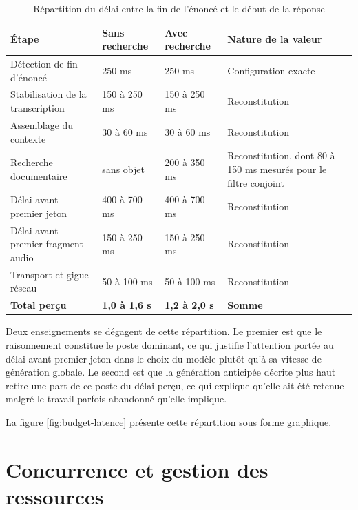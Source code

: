 \begin{table}[H]
\centering
\renewcommand{\arraystretch}{1.2}
\begin{tabular}{|p{5.0cm}|p{2.6cm}|p{2.6cm}|p{3.6cm}|}
\hline
\textbf{Étape} & \textbf{Sans recherche} & \textbf{Avec recherche} & \textbf{Nature de la valeur} \\
\hline
Détection de fin d'énoncé & 250 ms & 250 ms & Configuration exacte \\
\hline
Stabilisation de la transcription & 150 à 250 ms & 150 à 250 ms & Reconstitution \\
\hline
Assemblage du contexte & 30 à 60 ms & 30 à 60 ms & Reconstitution \\
\hline
Recherche documentaire & sans objet & 200 à 350 ms & Reconstitution, dont 80 à 150 ms mesurés pour le filtre conjoint \\
\hline
Délai avant premier jeton & 400 à 700 ms & 400 à 700 ms & Reconstitution \\
\hline
Délai avant premier fragment audio & 150 à 250 ms & 150 à 250 ms & Reconstitution \\
\hline
Transport et gigue réseau & 50 à 100 ms & 50 à 100 ms & Reconstitution \\
\hline
\textbf{Total perçu} & \textbf{1,0 à 1,6 s} & \textbf{1,2 à 2,0 s} & \textbf{Somme} \\
\hline
\end{tabular}
\caption{Répartition du délai entre la fin de l'énoncé et le début de la réponse}
\label{tab:budget-latence}
\end{table}

Deux enseignements se dégagent de cette répartition. Le premier est que le raisonnement constitue le poste dominant, ce qui justifie l'attention portée au délai avant premier jeton dans le choix du modèle plutôt qu'à sa vitesse de génération globale. Le second est que la génération anticipée décrite plus haut retire une part de ce poste du délai perçu, ce qui explique qu'elle ait été retenue malgré le travail parfois abandonné qu'elle implique.

La figure \ref{fig:budget-latence} présente cette répartition sous forme graphique.


\section{Concurrence et gestion des ressources}

